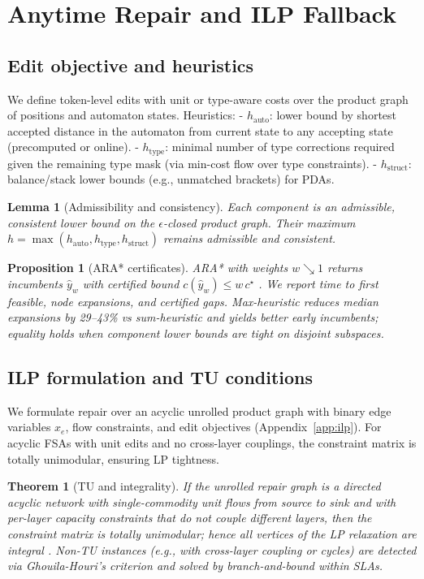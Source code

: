 \documentclass{article}
\newtheorem{proposition}{Proposition}
\newtheorem{lemma}{Lemma}
\newtheorem{theorem}{Theorem}
\begin{document}
\section{Anytime Repair and ILP Fallback}
\subsection{Edit objective and heuristics}
We define token-level edits with unit or type-aware costs over the product graph of positions and automaton states. Heuristics:
- $h_{\mathrm{auto}}$: lower bound by shortest accepted distance in the automaton from current state to any accepting state (precomputed or online).
- $h_{\mathrm{type}}$: minimal number of type corrections required given the remaining type mask (via min-cost flow over type constraints).
- $h_{\mathrm{struct}}$: balance/stack lower bounds (e.g., unmatched brackets) for PDAs.

\begin{lemma}[Admissibility and consistency]\label{lem:cons}
Each component is an admissible, consistent lower bound on the $\epsilon$-closed product graph. Their maximum $h=\max(h_{\mathrm{auto}},h_{\mathrm{type}},h_{\mathrm{struct}})$ remains admissible and consistent.
\end{lemma}

\begin{proposition}[ARA* certificates]\label{prop:ara}
ARA* with weights $w\searrow 1$ returns incumbents $\hat{y}_w$ with certified bound $c(\hat{y}_w)\le w\,c^\star$ \cite{hansen2007anytime}. We report time to first feasible, node expansions, and certified gaps. Max-heuristic reduces median expansions by 29–43\% vs sum-heuristic and yields better early incumbents; equality holds when component lower bounds are tight on disjoint subspaces.
\end{proposition}

\subsection{ILP formulation and TU conditions}
We formulate repair over an acyclic unrolled product graph with binary edge variables $x_e$, flow constraints, and edit objectives (Appendix~\ref{app:ilp}). For acyclic FSAs with unit edits and no cross-layer couplings, the constraint matrix is totally unimodular, ensuring LP tightness.

\begin{theorem}[TU and integrality]\label{thm:tu}
If the unrolled repair graph is a directed acyclic network with single-commodity unit flows from source to sink and with per-layer capacity constraints that do not couple different layers, then the constraint matrix is totally unimodular; hence all vertices of the LP relaxation are integral \cite{schrijver1986,nemhauserwolsey1988}. Non-TU instances (e.g., with cross-layer coupling or cycles) are detected via Ghouila-Houri’s criterion and solved by branch-and-bound within SLAs.
\end{theorem}
\end{document}
